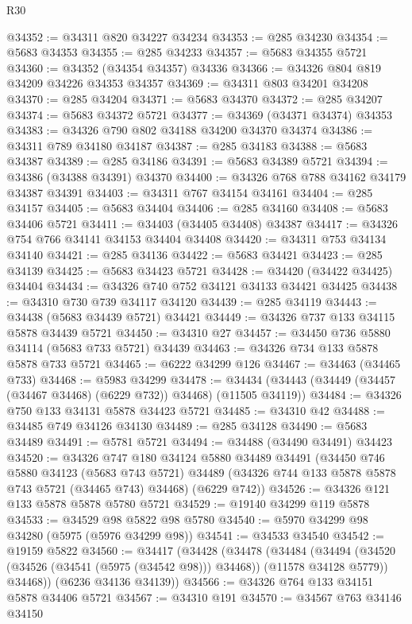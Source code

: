 \begin{lexlean}{R30}
\begin{coremodule}
@34352 := @34311 @820 @34227 @34234
@34353 := @285 @34230
@34354 := @5683 @34353
@34355 := @285 @34233
@34357 := @5683 @34355 @5721
@34360 := @34352 (@34354 @34357) @34336
@34366 := @34326 @804 @819 @34209 @34226 @34353 @34357
@34369 := @34311 @803 @34201 @34208
@34370 := @285 @34204
@34371 := @5683 @34370
@34372 := @285 @34207
@34374 := @5683 @34372 @5721
@34377 := @34369 (@34371 @34374) @34353
@34383 := @34326 @790 @802 @34188 @34200 @34370 @34374
@34386 := @34311 @789 @34180 @34187
@34387 := @285 @34183
@34388 := @5683 @34387
@34389 := @285 @34186
@34391 := @5683 @34389 @5721
@34394 := @34386 (@34388 @34391) @34370
@34400 := @34326 @768 @788 @34162 @34179 @34387 @34391
@34403 := @34311 @767 @34154 @34161
@34404 := @285 @34157
@34405 := @5683 @34404
@34406 := @285 @34160
@34408 := @5683 @34406 @5721
@34411 := @34403 (@34405 @34408) @34387
@34417 := @34326 @754 @766 @34141 @34153 @34404 @34408
@34420 := @34311 @753 @34134 @34140
@34421 := @285 @34136
@34422 := @5683 @34421
@34423 := @285 @34139
@34425 := @5683 @34423 @5721
@34428 := @34420 (@34422 @34425) @34404
@34434 := @34326 @740 @752 @34121 @34133 @34421 @34425
@34438 := @34310 @730 @739 @34117 @34120
@34439 := @285 @34119
@34443 := @34438 (@5683 @34439 @5721) @34421
@34449 := @34326 @737 @133 @34115 @5878 @34439 @5721
@34450 := @34310 @27
@34457 := @34450 @736 @5880 @34114 (@5683 @733 @5721) @34439
@34463 := @34326 @734 @133 @5878 @5878 @733 @5721
@34465 := @6222 @34299 @126
@34467 := @34463 (@34465 @733)
@34468 := @5983 @34299
@34478 := @34434 (@34443 (@34449 (@34457 (@34467 @34468) (@6229 @732)) @34468) (@11505 @34119))
@34484 := @34326 @750 @133 @34131 @5878 @34423 @5721
@34485 := @34310 @42
@34488 := @34485 @749 @34126 @34130
@34489 := @285 @34128
@34490 := @5683 @34489
@34491 := @5781 @5721
@34494 := @34488 (@34490 @34491) @34423
@34520 := @34326
    @747
    @180
    @34124
    @5880
    @34489
    @34491
    (@34450
      @746
      @5880
      @34123
      (@5683 @743 @5721)
      @34489
      (@34326 @744 @133 @5878 @5878 @743 @5721 (@34465 @743) @34468)
      (@6229 @742))
@34526 := @34326 @121 @133 @5878 @5878 @5780 @5721
@34529 := @19140 @34299 @119 @5878
@34533 := @34529 @98 @5822 @98 @5780
@34540 := @5970 @34299 @98 @34280 (@5975 (@5976 @34299 @98))
@34541 := @34533 @34540
@34542 := @19159 @5822
@34560 := @34417
    (@34428
      (@34478
        (@34484
          (@34494 (@34520 (@34526 (@34541 (@5975 (@34542 @98))) @34468)) (@11578 @34128 @5779))
          @34468))
      (@6236 @34136 @34139))
@34566 := @34326 @764 @133 @34151 @5878 @34406 @5721
@34567 := @34310 @191
@34570 := @34567 @763 @34146 @34150

\end{coremodule}
\end{lexlean}
